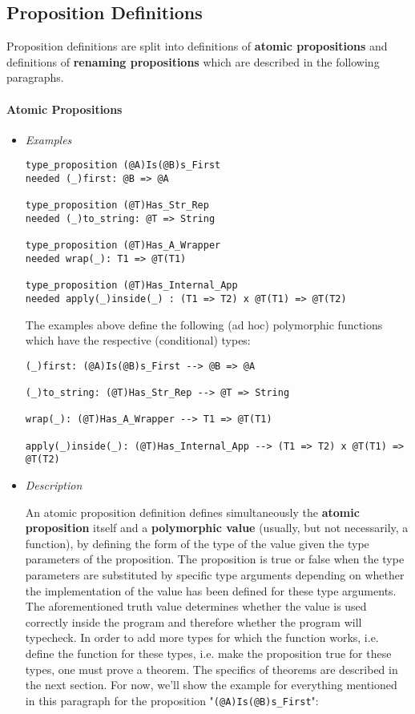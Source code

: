 \documentclass[diploma]{softlab-thesis}
\begin{document}
\subsection{Proposition Definitions}

Proposition definitions are split into definitions of \textbf{atomic
propositions} and definitions of \textbf{renaming propositions} which are
described in the following paragraphs.

\paragraph{Atomic Propositions}

\begin{itemize}
\item \textit{Examples}
\begin{verbatim}
type_proposition (@A)Is(@B)s_First
needed (_)first: @B => @A

type_proposition (@T)Has_Str_Rep
needed (_)to_string: @T => String

type_proposition (@T)Has_A_Wrapper
needed wrap(_): T1 => @T(T1)

type_proposition (@T)Has_Internal_App
needed apply(_)inside(_) : (T1 => T2) x @T(T1) => @T(T2)
\end{verbatim}
The examples above define the following (ad hoc) polymorphic functions which
have the respective (conditional) types:
\begin{verbatim}
(_)first: (@A)Is(@B)s_First --> @B => @A

(_)to_string: (@T)Has_Str_Rep --> @T => String

wrap(_): (@T)Has_A_Wrapper --> T1 => @T(T1)

apply(_)inside(_): (@T)Has_Internal_App --> (T1 => T2) x @T(T1) => @T(T2)
\end{verbatim}

\newpage

\item \textit{Description}

An atomic proposition definition defines simultaneously the \textbf{atomic
proposition} itself and a \textbf{polymorphic value} (usually, but not
necessarily, a function), by defining the form of the type of the value given
the type parameters of the proposition. The proposition is true or false when
the type parameters are substituted by specific type arguments depending on
whether the implementation of the value has been defined for these type
arguments. The aforementioned truth value determines whether the value is used
correctly inside the program and therefore whether the program will typecheck.
In order to add more types for which the function works, i.e.  define the
function for these types, i.e. make the proposition true for these types, one
must prove a theorem. The specifics of theorems are described in the next
section. For now, we'll show the example for everything mentioned in this
paragraph for the proposition "\verb|(@A)Is(@B)s_First|":


\end{itemize}
\end{document}
